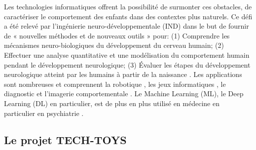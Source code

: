 \documentclass[8pt]{article}
\begin{document}
\par Les technologies informatiques offrent la possibilité de surmonter ces obstacles, de caractériser le comportement des enfants dans des contextes plus naturels. Ce défi a été relevé par l'ingénierie neuro-développementale (IND)
\cite{campolo_novel_2008,campolo_neuro-developmental_2010} dans le but de fournir de « nouvelles méthodes et de nouveaux outils » pour: (1) Comprendre les mécanismes neuro-biologiques du développement du cerveau humain; (2) Effectuer une analyse quantitative et une modélisation du comportement humain pendant le développement neurologique; (3) Évaluer les étapes du développement neurologique atteint par les humains à partir de la naissance \cite{campolo_neuro-developmental_2010}.
Les applications sont nombreuses et comprennent la robotique \cite{scassellati_improving_2018,jouaiti_robot-based_2019}, les jeux informatiques \cite{grossard_serious_2017}, le diagnostic \cite{bangerter_autism_2017,hashemi_computer_2014} et l'imagerie comportementale \cite{torres_characterization_2016,anzalone_how_2014,anzalone_quantifying_2019}. Le Machine Learning (ML), le Deep Learning (DL) \cite{zemouri_deep_2019,mahmud_deep_2021} en particulier, est de plus en plus utilisé en médecine \cite{triantafyllidis_applications_2019,mahmud_deep_2021} en particulier en psychiatrie \cite{koppe_deep_2021}.

\subsection{Le projet TECH-TOYS}
\end{document}
